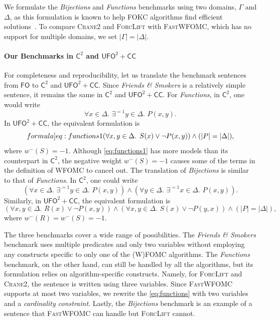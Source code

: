 \documentclass[a4paper,UKenglish,cleveref,autoref]{lipics-v2021}
\newcommand{\Cranetwo}{\textsc{Crane2}}
\newcommand{\friends}{\emph{Friends \& Smokers}}
\newcommand{\functions}{\emph{Functions}}
\newcommand{\bijections}{\emph{Bijections}}
\newcommand{\Ctwo}{$\mathsf{C}^{2}$}
\newcommand{\FO}{$\mathsf{FO}$}
\newcommand{\UFO}{$\mathsf{UFO}^{2} + \mathsf{CC}$}
\begin{document}
\begin{remark*}
  We formulate the \bijections{} and \functions{} benchmarks using two domains,
  $\Gamma$ and $\Delta$, as this formulation is known to help FOKC algorithms
  find efficient solutions~\cite{DBLP:conf/kr/DilkasB23}. To compare \Cranetwo{}
  and \textsc{ForcLift} with \textsc{FastWFOMC}, which has no support for
  multiple domains, we set $|\Gamma| = |\Delta|$.
\end{remark*}

\paragraph*{Our Benchmarks in \Ctwo{} and \UFO{}}
For completeness and reproducibility, let us translate the benchmark sentences
from \FO{} to \Ctwo{} and \UFO{}. Since \friends{} is a relatively simple
sentence, it remains the same in \Ctwo{} and \UFO{}. For \functions{}, in
\Ctwo{}, one would write
\[
  \forall x \in \Delta\text{. }\exists^{=1} y \in \Delta\text{. }P(x, y).
\]
In \UFO{}, the equivalent formulation is
\begin{equation}\label[formula]{eq:functions1}
  (\forall x, y \in \Delta\text{. }S(x) \lor \neg P(x, y)) \land (|P| = |\Delta|),
\end{equation}
where $w^{-}(S) = -1$. Although \cref{eq:functions1} has more models than its
counterpart in \Ctwo{}, the negative weight $w^{-}(S) = -1$ causes some of the
terms in the definition of WFOMC to cancel out. The translation of \bijections{}
is similar to that of \functions{}. In \Ctwo{}, one could write
\[
  (\forall x \in \Delta\text{. }\exists^{=1} y \in \Delta\text{.
  }P(x, y)) \land (\forall y \in \Delta\text{. }\exists^{=1} x \in \Delta\text{.
  }P(x, y)).
\]
Similarly, in \UFO{}, the equivalent formulation is
\[
  (\forall x, y \in \Delta\text{.
  }R(x) \lor \neg P(x, y)) \land (\forall x, y \in \Delta\text{.
  }S(x) \lor \neg P(y, x)) \land (|P| = |\Delta|),
\]
where $w^{-}(R) = w^{-}(S) = -1$.

The three benchmarks cover a wide range of possibilities. The \friends{}
benchmark uses multiple predicates and only two variables without employing any
constructs specific to only one of the (W)FOMC algorithms. The \functions{}
benchmark, on the other hand, can still be handled by all the algorithms, but
its formulation relies on algorithm-specific constructs. Namely, for
\textsc{ForcLift} and \Cranetwo{}, the sentence is written using three
variables. Since \textsc{FastWFOMC} supports at most two variables, we rewrite
the \cref{eq:functions} with two variables and a \emph{cardinality constraint}.
Lastly, the \bijections{} benchmark is an example of a sentence that
\textsc{FastWFOMC} can handle but \textsc{ForcLift} cannot.
\end{document}
